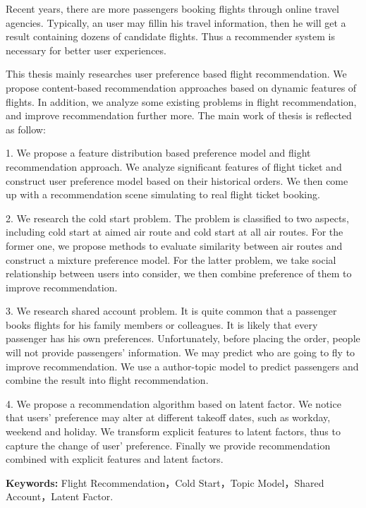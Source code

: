 \begin{englishabstract}

Recent years, there are more passengers booking flights through online travel agencies. Typically, an user may fillin his travel information, then he will get a result containing dozens of candidate flights. Thus a recommender system is necessary for better user experiences.

This thesis mainly researches user preference based flight recommendation. We propose content-based recommendation approaches based on dynamic features of flights. In addition, we analyze some existing problems in flight recommendation, and improve recommendation further more. The main work of thesis is reflected as follow:

1. We propose a feature distribution based preference model and flight recommendation approach. We analyze significant features of flight ticket and construct user preference model based on their historical orders. We then come up with a recommendation scene simulating to real flight ticket booking.

2. We research the cold start problem. The problem is classified to two aspects, including cold start at aimed air route and cold start at all air routes. For the former one, we propose methods to evaluate similarity between air routes and construct a mixture preference model. For the latter problem, we take social relationship between users into consider, we then combine preference of them to improve recommendation.

3. We research shared account problem. It is quite common that a passenger books flights for his family members or colleagues. It is likely that every passenger has his own preferences. Unfortunately, before placing the order, people will not provide passengers' information. We may predict who are going to fly to improve recommendation. We use a author-topic model to predict passengers and combine the result into flight recommendation.

4. We propose a recommendation algorithm based on latent factor. We notice that users' preference may alter at different takeoff dates, such as workday, weekend and holiday. We transform explicit features to latent factors, thus to capture the change of user' preference. Finally we provide recommendation combined with explicit features and latent factors.


\textbf{Keywords:} Flight Recommendation，Cold Start，Topic Model，Shared Account，Latent Factor.
\end{englishabstract}

